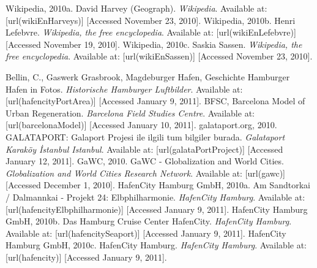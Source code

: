 \myLinksOld%
{%
\startREF%
Wikipedia, 2010a. David Harvey (Geograph). {\em Wikipedia}. Available at:  [url(wikiEnHarveys)] [Accessed November 23, 2010].%
\nl%
Wikipedia, 2010b. Henri Lefebvre. {\em Wikipedia, the free encyclopedia}. Available at:  [url(wikiEnLefebvre)] [Accessed November 19, 2010].%
\nl%
Wikipedia, 2010c. Saskia Sassen. {\em Wikipedia, the free encyclopedia}. Available at:  [url(wikiEnSassen)] [Accessed November 23, 2010].%
\stopREF%
}

\myLinksOld%
{%
\startREF%
%
Bellin, C., Gaswerk Grasbrook, Magdeburger Hafen, Geschichte Hamburger Hafen in Fotos. {\em Historische Hamburger Luftbilder}. Available at: [url(hafencityPortArea)] [Accessed January 9, 2011]. \nl %
%
BFSC, Barcelona Model of Urban Regeneration. {\em Barcelona Field Studies Centre}. Available at:  [url(barcelonaModel)] [Accessed January 10, 2011]. \nl%
%
galataport.org, 2010. GALATAPORT: Galaport Projesi ile ilgili tum bilgiler burada. {\em Galataport Karaköy İstanbul Istanbul}. Available at:  [url(galataPortProject)] [Accessed January 12, 2011]. \nl%
%
GaWC, 2010. GaWC - Globalization and World Cities. {\em Globalization and World Cities Research Network}. Available at:  [url(gawc)] [Accessed December 1, 2010]. \nl%
%
HafenCity Hamburg GmbH, 2010a. Am Sandtorkai / Dalmannkai - Projekt 24: Elbphilharmonie. {\em HafenCity Hamburg}. Available at:  [url(hafencityElbphilharmonie)] [Accessed January 9, 2011]. \nl%
%
HafenCity Hamburg GmbH, 2010b. Das Hamburg Cruise Center HafenCity. {\em HafenCity Hamburg}. Available at:  [url(hafencitySeaport)] [Accessed January 9, 2011]. \nl%
%
HafenCity Hamburg GmbH, 2010c. HafenCity Hamburg. {\em HafenCity Hamburg}. Available at:  [url(hafencity)] [Accessed January 9, 2011]. \nl%
}
